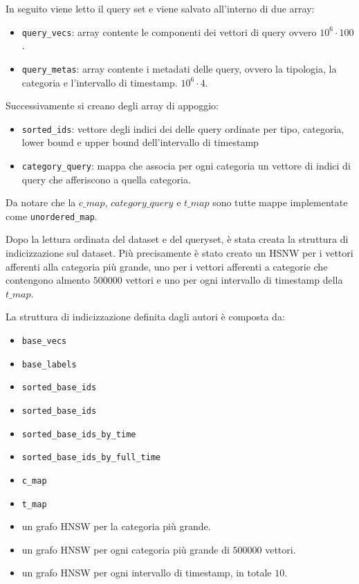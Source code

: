In seguito viene letto il query set e viene salvato all'interno di due array:
\begin{itemize}
    \item \texttt{query\_vecs}: array contente le componenti dei vettori di query ovvero 
    $10^6 \cdot 100$.
    \item \texttt{query\_metas}: array contente i metadati delle query, ovvero la tipologia,
    la categoria e l'intervallo di timestamp.
    $10^6 \cdot 4$.
\end{itemize}

Successivamente si creano degli array di appoggio:
\begin{itemize}
    \item \texttt{sorted\_ids}: vettore degli indici dei delle query ordinate per tipo, 
    categoria, lower bound e upper bound dell'intervallo di timestamp
    \item \texttt{category\_query}: mappa che associa per ogni categoria un vettore di 
    indici di query che afferiscono a quella categoria.
\end{itemize}

Da notare che la $c\_map$, $category\_query$ e $t\_map$ sono tutte mappe implementate 
come \texttt{unordered\_map}.

Dopo la lettura ordinata del dataset e del queryset, è stata creata la struttura 
di indicizzazione sul dataset. Più precisamente è stato creato un HSNW per i vettori 
afferenti alla categoria più grande, uno per i vettori afferenti a categorie che 
contengono almento $500000$ vettori e uno per ogni intervallo di timestamp della 
$t\_map$.

La struttura di indicizzazione definita dagli autori è composta da:
\begin{itemize}
    \item \texttt{base\_vecs}
    \item \texttt{base\_labels}
    \item \texttt{sorted\_base\_ids}
    \item \texttt{sorted\_base\_ids}
    \item \texttt{sorted\_base\_ids\_by\_time} 
    \item \texttt{sorted\_base\_ids\_by\_full\_time}
    \item \texttt{c\_map}
    \item \texttt{t\_map}
    \item un grafo HNSW per la categoria più grande.
    \item un grafo HNSW per ogni categoria più grande di $500000$ vettori.
    \item un grafo HNSW per ogni intervallo di timestamp, in totale $10$.
\end{itemize}

